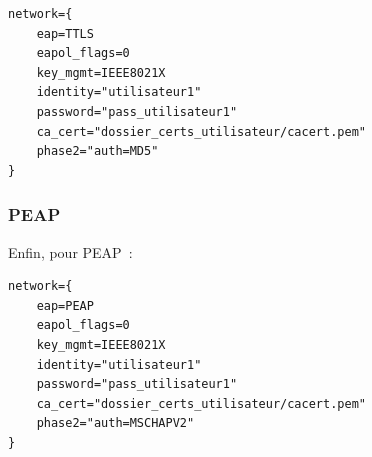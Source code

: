 \begin{lstlisting}
network={
    eap=TTLS
    eapol_flags=0
    key_mgmt=IEEE8021X
    identity="utilisateur1"
    password="pass_utilisateur1"
    ca_cert="dossier_certs_utilisateur/cacert.pem"
    phase2="auth=MD5"
}
\end{lstlisting}

\subsubsection{PEAP}

Enfin, pour PEAP~:

\begin{lstlisting}
network={
    eap=PEAP
    eapol_flags=0
    key_mgmt=IEEE8021X
    identity="utilisateur1"
    password="pass_utilisateur1"
    ca_cert="dossier_certs_utilisateur/cacert.pem"
    phase2="auth=MSCHAPV2"
}
\end{lstlisting}



